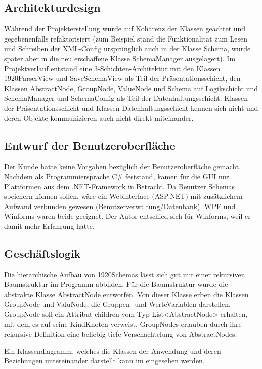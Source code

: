 \subsection{Architekturdesign}
\label{sec:Architekturdesign}
Während der Projekterstellung wurde auf Kohärenz der Klassen geachtet und gegebenenfalls refaktorisiert (zum Beispiel stand die Funktionalität zum Lesen und Schreiben der XML-Config ursprünglich auch in der Klasse Schema, wurde später aber in die neu erschaffene Klasse SchemaManager ausgelagert). Im Projektverlauf entstand eine 3-Schichten-Architektur mit den Klassen 1920ParserView und SaveSchemaView als Teil der Präsentationsschicht, den Klassen AbstractNode, GroupNode, ValueNode und Schema auf Logikschicht und SchemaManager und SchemaConfig als Teil der Datenhaltungsschicht. Klassen der Präsentationsschicht und Klassen Datenhaltungsschicht kennen sich nicht und deren Objekte kommunizieren auch nicht direkt miteinander.

\subsection{Entwurf der Benutzeroberfläche}
\label{sec:Benutzeroberflaeche}
Der Kunde hatte keine Vorgaben bezüglich der Benutzeroberfläche gemacht. 
Nachdem als Programmiersprache C\# feststand, kamen für die \ac{GUI} nur  Plattformen aus dem .NET-Framework in Betracht. Da Benutzer Schemas speichern können sollen, wäre ein Webinterface (ASP.NET) mit zusätzlichem Aufwand verbunden gewesen (Benutzerverwaltung/Datenbank). \ac{WPF} und Winforms waren beide geeignet. Der Autor entschied sich für Winforms, weil er damit mehr Erfahrung hatte.

\subsection{Geschäftslogik}
\label{sec:Geschaeftslogik}
Die hierarchische Aufbau von 1920Schemas lässt sich gut mit einer rekursiven Baumstruktur im Programm abbilden. 
Für die Baumstruktur wurde die abstrakte Klasse AbstractNode entworfen. Von dieser Klasse erben die Klassen GroupNode und ValuNode, die Gruppen- und WerteVariablen darstellen. GroupNode soll ein Attribut children vom Typ List<AbstractNode> erhalten, mit dem es auf seine KindKnoten verweist. GroupNodes erlauben durch ihre rekursive Definition eine beliebig tiefe Verschachtelung von AbstractNodes.

Ein Klassendiagramm, welches die Klassen der Anwendung und deren Beziehungen untereinander darstellt kann im  eingesehen werden.



